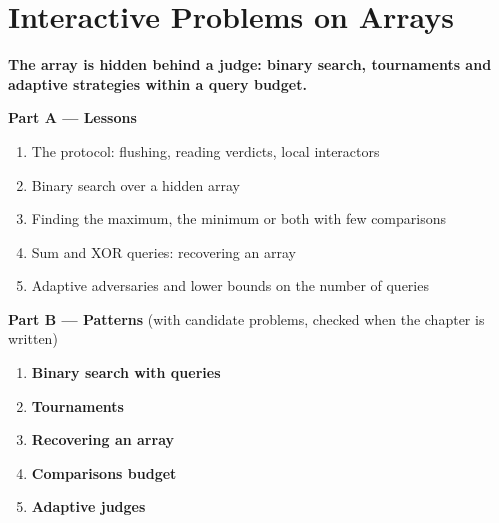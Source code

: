 \chapter{Interactive Problems on Arrays}
\label{ch:interactive}

\begin{tcolorbox}[enhanced, colback=white, colframe=secondaryblue, boxrule=1pt, arc=2mm]
\textbf{\large\textcolor{primaryblue}{The array is hidden behind a judge: binary search, tournaments and adaptive strategies within a query budget.}}
\end{tcolorbox}


\begin{plannedbox}
\textbf{Part A --- Lessons}
\begin{enumerate}[leftmargin=*, label=\textbf{A\arabic*.}, itemsep=1pt]
    \item The protocol: flushing, reading verdicts, local interactors
    \item Binary search over a hidden array
    \item Finding the maximum, the minimum or both with few comparisons
    \item Sum and XOR queries: recovering an array
    \item Adaptive adversaries and lower bounds on the number of queries
\end{enumerate}
\textbf{Part B --- Patterns} (with candidate problems, checked when the chapter is written)
\begin{enumerate}[leftmargin=*, label=\textbf{P\arabic*.}, itemsep=1pt]
    \item \textbf{Binary search with queries}
    \item \textbf{Tournaments}
    \item \textbf{Recovering an array}
    \item \textbf{Comparisons budget}
    \item \textbf{Adaptive judges}
\end{enumerate}
\end{plannedbox}

